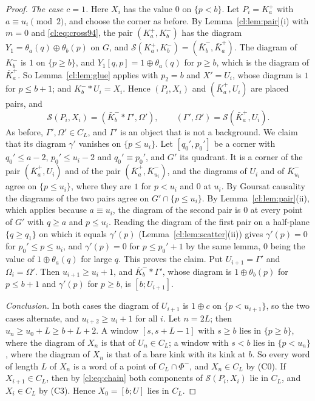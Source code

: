 \begin{proof}
\emph{The case $c=1$.} Here $X_i$ has the value $0$ on $\{p<b\}$. Let $P_i=K^+_a$ with $a\equiv u_i\pmod2$, and choose the corner as before. By Lemma~\ref{cl:lem:pair}(i) with $m=0$ and \eqref{cl:eq:cross94}, the pair $(K^+_a,K^-_b)$ has the diagram $Y_1=\theta_a(q)\oplus\theta_b(p)$ on $G$, and $\mathcal S(K^+_a,K^-_b)=(\bar K^-_b,\bar K^+_a)$. The diagram of $K^-_b$ is $1$ on $\{p\ge b\}$, and $Y_1[q,p]=1\oplus\theta_a(q)$ for $p\ge b$, which is the diagram of $\bar K^+_a$. So Lemma~\ref{cl:lem:glue} applies with $p_2=b$ and $X'=U_i$, whose diagram is $1$ for $p\le b+1$; and $K^-_b*U_i=X_i$. Hence $(P_i,X_i)$ and $(\bar K^+_a,U_i)$ are placed pairs, and
\[
\mathcal S(P_i,X_i)=(\bar K^-_b*\Gamma',\Omega'),\qquad(\Gamma',\Omega')=\mathcal S(\bar K^+_a,U_i).
\]
As before, $\Gamma',\Omega'\in C_L$, and $\Gamma'$ is an object that is not a background. We claim that its diagram $\gamma'$ vanishes on $\{p\le u_i\}$. Let $[q_0',p_0']$ be a corner with $q_0'\le a-2$, $p_0'\le u_i-2$ and $q_0'\equiv p_0'$, and $G'$ its quadrant. It is a corner of the pair $(\bar K^+_a,U_i)$ and of the pair $(\bar K^+_a,\bar K^-_{u_i})$, and the diagrams of $U_i$ and of $\bar K^-_{u_i}$ agree on $\{p\le u_i\}$, where they are $1$ for $p<u_i$ and $0$ at $u_i$. By Goursat causality the diagrams of the two pairs agree on $G'\cap\{p\le u_i\}$. By Lemma~\ref{cl:lem:pair}(ii), which applies because $a\equiv u_i$, the diagram of the second pair is $0$ at every point of $G'$ with $q\ge a$ and $p\le u_i$. Reading the diagram of the first pair on a half-plane $\{q\ge q_1\}$ on which it equals $\gamma'(p)$ (Lemma~\ref{cl:lem:scatter}(ii)) gives $\gamma'(p)=0$ for $p_0'\le p\le u_i$, and $\gamma'(p)=0$ for $p\le p_0'+1$ by the same lemma, $0$ being the value of $1\oplus\theta_a(q)$ for large $q$. This proves the claim. Put $U_{i+1}=\Gamma'$ and $\Omega_i=\Omega'$. Then $u_{i+1}\ge u_i+1$, and $\bar K^-_b*\Gamma'$, whose diagram is $1\oplus\theta_b(p)$ for $p\le b+1$ and $\gamma'(p)$ for $p\ge b$, is $[b;U_{i+1}]$.

\emph{Conclusion.} In both cases the diagram of $U_{i+1}$ is $1\oplus c$ on $\{p<u_{i+1}\}$, so the two cases alternate, and $u_{i+2}\ge u_i+1$ for all $i$. Let $n=2L$; then $u_n\ge u_0+L\ge b+L+2$. A window $[s,s+L-1]$ with $s\ge b$ lies in $\{p\ge b\}$, where the diagram of $X_n$ is that of $U_n\in C_L$; a window with $s<b$ lies in $\{p<u_n\}$, where the diagram of $X_n$ is that of a bare kink with its kink at $b$. So every word of length $L$ of $X_n$ is a word of a point of $C_L\cap\Phi^-$, and $X_n\in C_L$ by (C0). If $X_{i+1}\in C_L$, then by \eqref{cl:eq:chain} both components of $\mathcal S(P_i,X_i)$ lie in $C_L$, and $X_i\in C_L$ by (C3). Hence $X_0=[b;U]$ lies in $C_L$.
\end{proof}

